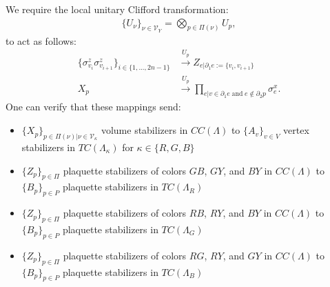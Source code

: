 \documentclass[12pt]{article}
\theoremstyle{definition}
\begin{document}
We require the local unitary Clifford transformation:
    \begin{align}
        \{U_\nu\}_{\nu\in\mathcal{V}_Y} = \bigotimes_{p\in\Pi(\nu)}U_p,
    \end{align}
to act as follows:
    \begin{align}
        \{\sigma^z_{v_i}\sigma^z_{v_{i+1}}\}_{i\in\{1,...,2n-1\}}&\xrightarrow{U_p}Z_{e|\partial_1e := \{v_i,v_{i+1}\}}\\
        X_p&\xrightarrow{U_p}\prod_{e|v\in\partial_1e\;\text{and}\;e\notin\partial_2p}\sigma^x_e.
    \end{align}
One can verify that these mappings send:
    \begin{itemize}
        \item $\{X_p\}_{p\in\Pi(\nu)|\nu\in\mathcal{V}_\kappa}$ volume stabilizers in $CC(\Lambda)$ to $\{A_v\}_{v\in V}$ vertex stabilizers in $TC(\Lambda_\kappa)$ for $\kappa\in\{R,G,B\}$
        \item $\{Z_p\}_{p\in\Pi}$ plaquette stabilizers of colors $GB$, $GY$, and $BY$ in $CC(\Lambda)$ to $\{B_p\}_{p\in P}$ plaquette stabilizers in $TC(\Lambda_R)$
        \item $\{Z_p\}_{p\in\Pi}$ plaquette stabilizers of colors $RB$, $RY$, and $BY$ in $CC(\Lambda)$ to $\{B_p\}_{p\in P}$ plaquette stabilizers in $TC(\Lambda_G)$
        \item $\{Z_p\}_{p\in\Pi}$ plaquette stabilizers of colors $RG$, $RY$, and $GY$ in $CC(\Lambda)$ to $\{B_p\}_{p\in P}$ plaquette stabilizers in $TC(\Lambda_B)$
    \end{itemize}
\end{document}

